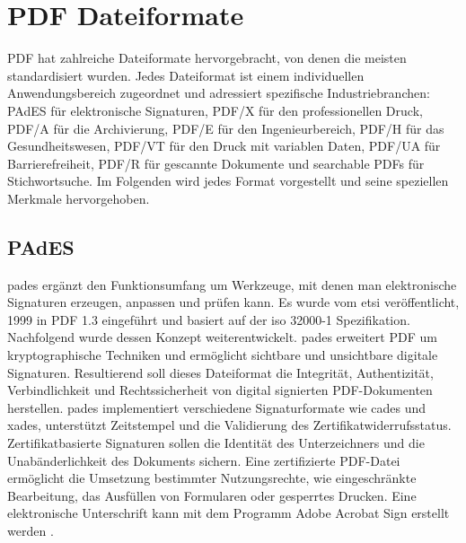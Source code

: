 \section{PDF Dateiformate}
PDF hat zahlreiche Dateiformate hervorgebracht, von denen die meisten standardisiert wurden. Jedes Dateiformat ist einem individuellen Anwendungsbereich zugeordnet und adressiert spezifische Industriebranchen: PAdES für elektronische Signaturen, PDF/X für den professionellen Druck, PDF/A für die Archivierung, PDF/E für den Ingenieurbereich, PDF/H für das Gesundheitswesen, PDF/VT für den Druck mit variablen Daten, PDF/UA für Barrierefreiheit, PDF/R für gescannte Dokumente und searchable PDFs für Stichwortsuche. Im Folgenden wird jedes Format vorgestellt und seine speziellen Merkmale hervorgehoben. 

\subsection{PAdES}
\gls{pades} ergänzt den Funktionsumfang um Werkzeuge, mit denen man elektronische Signaturen erzeugen, anpassen und prüfen kann. Es wurde vom \gls{etsi} veröffentlicht, 1999 in PDF 1.3 eingeführt und basiert auf der \gls{iso} 32000-1 Spezifikation. Nachfolgend wurde dessen Konzept weiterentwickelt. \gls{pades} erweitert PDF um kryptographische Techniken und ermöglicht sichtbare und unsichtbare digitale Signaturen. Resultierend soll dieses Dateiformat die Integrität, Authentizität, Verbindlichkeit und Rechtssicherheit von digital signierten PDF-Dokumenten herstellen. \gls{pades} implementiert verschiedene Signaturformate wie \gls{cades} und \gls{xades}, unterstützt Zeitstempel und die Validierung des Zertifikatwiderrufsstatus. Zertifikatbasierte Signaturen sollen die Identität des Unterzeichners und die Unabänderlichkeit des Dokuments sichern. Eine zertifizierte PDF-Datei ermöglicht die Umsetzung bestimmter Nutzungsrechte, wie eingeschränkte Bearbeitung, das Ausfüllen von Formularen oder gesperrtes Drucken. Eine elektronische Unterschrift kann mit dem Programm Adobe Acrobat Sign erstellt werden \cite{adobe-pdf-pades}. 

